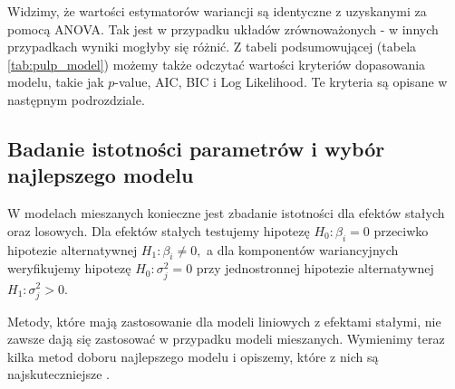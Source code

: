 \documentclass[12pt]{mwbk}
\theoremstyle{plain}
\theoremstyle{definition}
\theoremstyle{remark}
\begin{document}
Widzimy, że wartości estymatorów wariancji są identyczne z uzyskanymi za pomocą ANOVA. Tak jest w przypadku układów zrównoważonych - w innych przypadkach wyniki mogłyby się różnić. Z tabeli podsumowującej (tabela \ref{tab:pulp_model})  możemy także odczytać wartości kryteriów dopasowania modelu, takie jak $p$-value, AIC, BIC i Log Likelihood. Te kryteria są opisane w następnym podrozdziale.

\subsection{Badanie istotności parametrów i wybór najlepszego modelu}

W modelach mieszanych konieczne jest zbadanie istotności dla efektów stałych oraz losowych. Dla efektów stałych testujemy hipotezę $H_0: \beta_i=0$ przeciwko hipotezie alternatywnej $H_1: \beta_i \neq 0,$ a dla komponentów wariancyjnych weryfikujemy hipotezę $H_0: \sigma^2_j=0$ przy jednostronnej hipotezie alternatywnej  $H_1: \sigma^2_j>0.$ 



Metody, które mają zastosowanie dla modeli liniowych z efektami stałymi, nie zawsze dają się zastosować w przypadku modeli mieszanych. Wymienimy teraz kilka metod doboru najlepszego modelu i opiszemy, które z nich są najskuteczniejsze \cite{faraway}.
\end{document}
